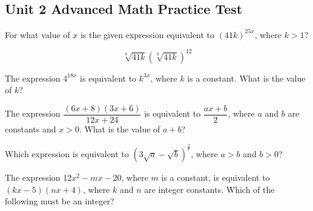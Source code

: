 \subsection*{Unit 2 Advanced Math Practice Test}

\setcounter{questionnum}{0}

\noindent\markforreview
\vspace{1em}

For what value of $x$ is the given expression equivalent to $(41k)^{25x}$, where $k > 1$?

\[
\sqrt[8]{41k}\left(\sqrt[9]{41k}\right)^{12}
\]

\vspace{2em}

\noindent\markforreview
\vspace{1em}

The expression $4^{18x}$ is equivalent to $k^{3x}$, where $k$ is a constant. What is the value of $k$?

\vspace{2em}

\noindent\markforreview
\vspace{1em}

The expression $\dfrac{(6x + 8)(3x + 6)}{12x + 24}$ is equivalent to $\dfrac{ax + b}{2}$, where $a$ and $b$ are constants and $x > 0$. What is the value of $a + b$?

\vspace{2em}

\noindent\markforreview
\vspace{1em}

Which expression is equivalent to $\left(3\sqrt{a} - \sqrt{b}\right)^{\frac{2}{7}}$, where $a > b$ and $b > 0$?

\vspace{0.75em}


\vspace{2em}

\noindent\markforreview
\vspace{1em}

The expression $12x^2 - mx - 20$, where $m$ is a constant, is equivalent to $(kx - 5)(nx + 4)$, where $k$ and $n$ are integer constants. Which of the following must be an integer?

\vspace{0.75em}


